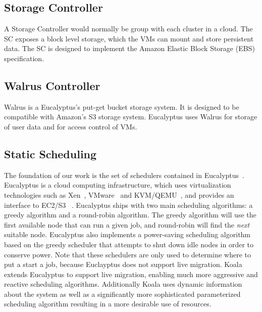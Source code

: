 \subsection{Storage Controller}
A Storage Controller would normally be group with each cluster in a cloud.  The SC exposes a block level storage, which the VMs can mount and store persistent data.  The SC is designed to implement the Amazon Elastic Block Storage (EBS) specification.

\subsection{Walrus Controller}
Walrus is a Eucalyptus's put-get bucket storage system.  It is designed to be compatible with Amazon's S3 storage system.  Eucalyptus uses Walrus for storage of user data and for access control of VMs.

\subsection{Static Scheduling}
The foundation of our work is the set of schedulers contained in
Eucalyptus~\cite{Eucalyptus}.  Eucalyptus is a cloud computing infrastructure,
which uses virtualization technologies such as Xen~\cite{Xen},
VMware~\cite{VMware} and KVM/QEMU~\cite{QEMU}, and provides an interface to
EC2/S3 ~\cite{AWS}.   Eucalyptus ships with two main scheduling algorithms: a
greedy algorithm and a round-robin algorithm.  The greedy algorithm will use the
first available node that can run a given job, and round-robin will find the
\emph{next} suitable node.  Eucalyptus also implements a power-saving scheduling
algorithm based on the greedy scheduler that attempts to shut down idle nodes in
order to conserve power.  Note that these schedulers are only used to determine
where to put a start a job, because Euclayptus does not support live migration.
Koala extends Eucalyptus to support live migration, enabling much more
aggressive and reactive scheduling algorithms.  Additionally Koala uses dynamic
information about the system as well as a significantly more sophisticated
parameterized scheduling algorithm resulting in a more desirable use of
resources.

